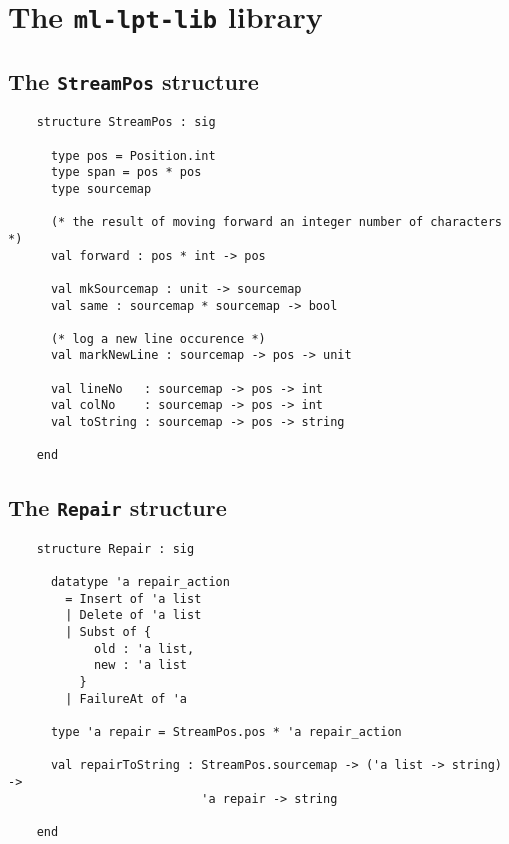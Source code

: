 \chapter{The {\tt ml-lpt-lib} library}\label{ch:ml-lpt-lib}



\section{The {\tt StreamPos} structure}

\begin{verbatim}
    structure StreamPos : sig

      type pos = Position.int
      type span = pos * pos
      type sourcemap

      (* the result of moving forward an integer number of characters *)
      val forward : pos * int -> pos

      val mkSourcemap : unit -> sourcemap
      val same : sourcemap * sourcemap -> bool

      (* log a new line occurence *)
      val markNewLine : sourcemap -> pos -> unit

      val lineNo   : sourcemap -> pos -> int
      val colNo    : sourcemap -> pos -> int
      val toString : sourcemap -> pos -> string

    end
\end{verbatim}


\section{The {\tt Repair} structure}

\begin{verbatim}
    structure Repair : sig

      datatype 'a repair_action
        = Insert of 'a list
        | Delete of 'a list
        | Subst of {
            old : 'a list,
            new : 'a list
          }
        | FailureAt of 'a
      
      type 'a repair = StreamPos.pos * 'a repair_action
      
      val repairToString : StreamPos.sourcemap -> ('a list -> string) ->
                           'a repair -> string
        
    end
\end{verbatim}